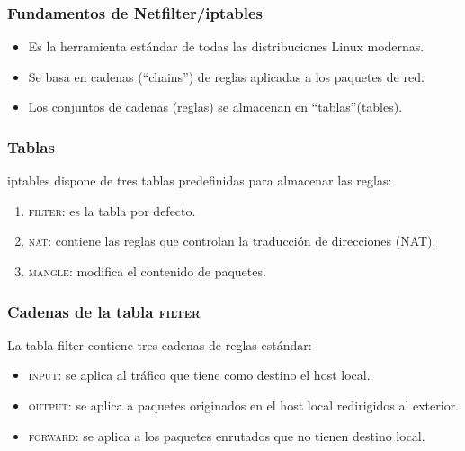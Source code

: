 \documentclass{beamer}
\begin{document}

\begin{frame}
\frametitle{Fundamentos de Netfilter/iptables}

\begin{itemize}
\item Es la herramienta estándar de todas las distribuciones Linux modernas.
\item Se basa en cadenas (``\alert{chains}'') de reglas aplicadas a los paquetes de red.
\item Los conjuntos de cadenas (reglas) se almacenan en ``tablas''(\alert{tables}).
\end{itemize}

\end{frame}



\begin{frame}
\frametitle{Tablas}

iptables dispone de tres tablas predefinidas para almacenar las reglas:

	\begin{enumerate}
	\item \textsc{filter}: es la tabla por defecto.
	\item \textsc{nat}: contiene las reglas que controlan la traducción de direcciones (NAT).
	\item \textsc{mangle}: modifica el contenido de paquetes.
	\end{enumerate}

\end{frame}

\begin{frame}
\frametitle{Cadenas de la tabla \textsc{filter}}

La tabla \alert{filter} contiene tres cadenas de reglas estándar: 
	\begin{itemize}
	\item \textsc{input}: se aplica al tráfico que tiene como destino el host local.
	\item \textsc{output}: se aplica a paquetes originados en el host local redirigidos al exterior.
	\item \textsc{forward}: se aplica a los paquetes enrutados que no tienen destino local.
	\end{itemize}

\end{frame}
\end{document}
